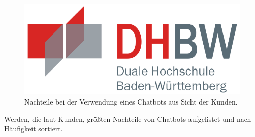 \begin{figure}[htb]
  \centering
  \includegraphics[width=12cm]{graphics/dhbw.png}
  \caption[Nachteile bei der Verwendung eines Chatbots aus Sicht der Kunden]{Nachteile bei der Verwendung eines Chatbots aus Sicht der Kunden. \footnotemark}
  \label{abb:NachteileChatbots}
\end{figure}

Werden, die laut Kunden, größten Nachteile von Chatbots aufgelistet und nach Häufigkeit sortiert.



